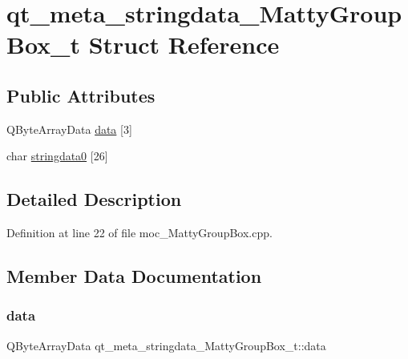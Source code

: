 \hypertarget{structqt__meta__stringdata__MattyGroupBox__t}{}\section{qt\+\_\+meta\+\_\+stringdata\+\_\+\+Matty\+Group\+Box\+\_\+t Struct Reference}
\label{structqt__meta__stringdata__MattyGroupBox__t}
\subsection*{Public Attributes}
\begin{DoxyCompactItemize}
\item 
Q\+Byte\+Array\+Data \hyperlink{structqt__meta__stringdata__MattyGroupBox__t_a4f9861808bbbbbe2e28aeb88748e1839}{data} \mbox{[}3\mbox{]}
\item 
char \hyperlink{structqt__meta__stringdata__MattyGroupBox__t_a7dd92394a2028cd695441f73c63474c9}{stringdata0} \mbox{[}26\mbox{]}
\end{DoxyCompactItemize}


\subsection{Detailed Description}


Definition at line 22 of file moc\+\_\+\+Matty\+Group\+Box.\+cpp.



\subsection{Member Data Documentation}
\hypertarget{structqt__meta__stringdata__MattyGroupBox__t_a4f9861808bbbbbe2e28aeb88748e1839}{}\label{structqt__meta__stringdata__MattyGroupBox__t_a4f9861808bbbbbe2e28aeb88748e1839} 
\subsubsection{\texorpdfstring{data}{data}}
{\footnotesize\ttfamily Q\+Byte\+Array\+Data qt\+\_\+meta\+\_\+stringdata\+\_\+\+Matty\+Group\+Box\+\_\+t\+::data}



